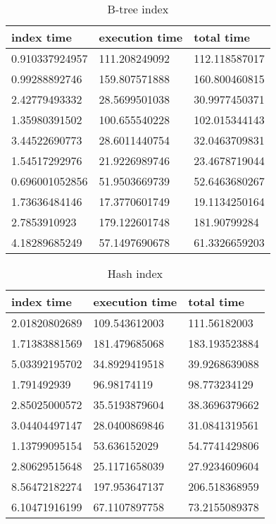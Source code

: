 \begin{itemize*}
\begin{table}[H]
\begin{center}
\begin{tabular}{|l|l|l|}
\hline
index time & execution time & total time                \\ \hline
0.910337924957 & 111.208249092 & 112.118587017 \\ \hline
0.99288892746 & 159.807571888 & 160.800460815 \\ \hline
2.42779493332 & 28.5699501038 & 30.9977450371 \\ \hline
1.35980391502 & 100.655540228 & 102.015344143 \\ \hline
3.44522690773 & 28.6011440754 & 32.0463709831 \\ \hline
1.54517292976 & 21.9226989746 & 23.4678719044 \\ \hline
0.696001052856 & 51.9503669739 & 52.6463680267 \\ \hline
1.73636484146 & 17.3770601749 & 19.1134250164 \\ \hline
2.7853910923 & 179.122601748 & 181.90799284 \\ \hline
4.18289685249 & 57.1497690678 & 61.3326659203 \\ \hline
\end{tabular}
\end{center}
\caption{B-tree index}
\end{table}

\begin{table}[H]
\begin{center}
\begin{tabular}{|l|l|l|}
\hline
index time & execution time & total time     \\ \hline
2.01820802689 & 109.543612003 & 111.56182003 \\ \hline
1.71383881569 & 181.479685068 & 183.193523884 \\ \hline
5.03392195702 & 34.8929419518 & 39.9268639088 \\ \hline
1.791492939 & 96.98174119 & 98.773234129 \\ \hline
2.85025000572 & 35.5193879604 & 38.3696379662 \\ \hline
3.04404497147 & 28.0400869846 & 31.0841319561 \\ \hline
1.13799095154 & 53.636152029 & 54.7741429806 \\ \hline
2.80629515648 & 25.1171658039 & 27.9234609604 \\ \hline
8.56472182274 & 197.953647137 & 206.518368959 \\ \hline
6.10471916199 & 67.1107897758 & 73.2155089378 \\ \hline
\end{tabular}
\end{center}
\caption{Hash index}
\end{table}


\end{itemize*}
